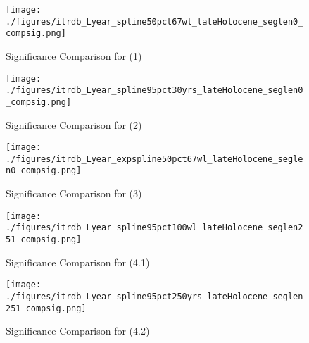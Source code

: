 \documentclass[smallextended]{svjour3}       %
\begin{document}
\clearpage
\newpage



\begin{figure}[!tbp]
\centering
\texttt{[image: ./figures/itrdb\_Lyear\_spline50pct67wl\_lateHolocene\_seglen0\_compsig.png]}

\noindent{}

\caption{Significance Comparison for (1)}

\label{compsig_1}
\end{figure}

\begin{figure}[!tbp]
\centering
\texttt{[image: ./figures/itrdb\_Lyear\_spline95pct30yrs\_lateHolocene\_seglen0\_compsig.png]}

\noindent{}

\caption{Significance Comparison for (2)}

\label{compsig_2}
\end{figure}

\begin{figure}[!tbp]
\centering
\texttt{[image: ./figures/itrdb\_Lyear\_expspline50pct67wl\_lateHolocene\_seglen0\_compsig.png]}

\noindent{}

\caption{Significance Comparison for (3)}

\label{compsig_3}
\end{figure}

\begin{figure}[!tbp]
\centering
\texttt{[image: ./figures/itrdb\_Lyear\_spline95pct100wl\_lateHolocene\_seglen251\_compsig.png]}

\noindent{}

\caption{Significance Comparison for (4.1)}

\label{compsig_4.1}
\end{figure}

\begin{figure}[!tbp]
\centering
\texttt{[image: ./figures/itrdb\_Lyear\_spline95pct250yrs\_lateHolocene\_seglen251\_compsig.png]}

\noindent{}

\caption{Significance Comparison for (4.2)}

\label{compsig_4.2}
\end{figure}
\end{document}
